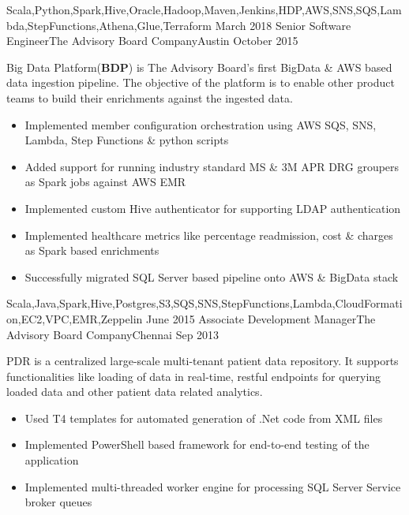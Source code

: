 \begin{experiences}
{\begin{itemize}
                      \end{itemize}
                    }
                    {Scala,Python,Spark,Hive,Oracle,Hadoop,Maven,Jenkins,HDP,AWS,SNS,SQS,Lambda,StepFunctions,Athena,Glue,Terraform}
  \emptySeparator
  \experience
    {March 2018} {Senior Software Engineer}{The Advisory Board Company}{Austin}
    {October 2015}    
    			 {
    	              Big Data Platform(\textbf{BDP}) is The Advisory Board's first BigData \& AWS based data ingestion pipeline. The objective of the platform is to enable other product teams to build their enrichments against the ingested data. 
    	              \begin{itemize}
    	              	\item Implemented member configuration orchestration using AWS SQS, SNS, Lambda, Step Functions \& python scripts                           
    	              	\item Added support for running industry standard MS \& 3M APR DRG groupers as Spark jobs against AWS EMR                        
    	              	\item Implemented custom Hive authenticator for supporting LDAP  authentication  
    	              	\item Implemented healthcare metrics like percentage readmission, cost \& charges as Spark based enrichments                
    	              	\item Successfully migrated SQL Server based pipeline onto AWS \& BigData stack\\
    	              \end{itemize}
                  }
              {Scala,Java,Spark,Hive,Postgres,S3,SQS,SNS,StepFunctions,Lambda,CloudFormation,EC2,VPC,EMR,Zeppelin}
  \emptySeparator
  \experience
    {June 2015}     {Associate Development Manager}{The Advisory Board Company}{Chennai}
    {Sep 2013}    {
    	              PDR is a centralized large-scale multi-tenant patient data repository. It supports functionalities like loading of data in real-time, restful endpoints for querying loaded data and other patient data related analytics.
                      \begin{itemize}
                        \item Used T4 templates for automated generation of .Net code from XML files
                        \item Implemented PowerShell based framework for end-to-end testing of the application
                        \item Implemented multi-threaded worker engine for processing SQL Server Service broker queues

\end{itemize}}
\end{experiences}
